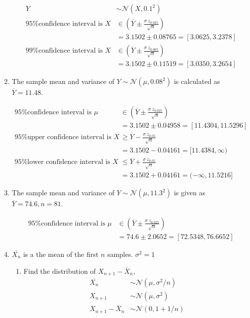 \begin{enumerate}
	
		\begin{align}
			Y &\sim \mathcal{N}(X, 0.1^2) \nonumber \\
			\text{95\% confidence interval is } X &\in \left(\overline{Y} \pm\frac{\sigma\ z_{0.025}}{\sqrt{n}}\right) \nonumber \\
			&= 3.1502 \pm 0.08765 = [3.0625, 3.2378] \\
			\text{99\% confidence interval is } X &\in \left(\overline{Y} \pm\frac{\sigma\ z_{0.005}}{\sqrt{n}}\right) \nonumber \\
			&= 3.1502 \pm 0.11519 = [3.0350, 3.2654]
		\end{align}
	
	
	\item The sample mean and variance of $ Y \sim \mathcal{N} (\mu, 0.08^2) $ is calculated as
	$ \overline{Y} = 11.48$.
	
	
		\begin{align}
			\text{95\% confidence interval is } \mu &\in \left(\overline{Y} \pm\frac{\sigma\ z_{0.025}}{\sqrt{n}}\right) \nonumber \\
			&= 3.1502 \pm 0.04958 = [11.4304, 11.5296] \\
			\text{95\% upper confidence interval is } X &\geq \overline{Y} - \frac{\sigma\ z_{0.05}}{\sqrt{n}} \nonumber \\
			&= 3.1502 - 0.04161 = [11.4384, \infty) \nonumber \\
			\text{95\% lower confidence interval is } X &\leq \overline{Y} + \frac{\sigma\ z_{0.05}}{\sqrt{n}} \nonumber \\
			&= 3.1502 + 0.04161 = (-\infty, 11.5216]
		\end{align}
	
	
	\item The sample mean and variance of $ Y \sim \mathcal{N} (\mu, 11.3^2) $ is given as
	$ \overline{Y} = 74.6, n = 81$.
	
	
		\begin{align}
			\text{95\% confidence interval is } \mu &\in \left(\overline{Y} \pm \frac{\sigma\ z_{0.025}}{\sqrt{n}}\right) \nonumber \\
			&= 74.6 \pm 2.0652 = [72.5348, 76.6652] 
		\end{align}
	
	
	\item $ \overline{X_n} $ is a the mean of the first $ n $ samples. $ \sigma^2 = 1 $ \\
	
		\begin{enumerate}
			\item Find the distribution of $ X_{n+1} - \overline{X}_n $,
			\begin{align}
				\overline{X_n} &\sim \mathcal{N}(\mu, \sigma^2/n) \nonumber \\
				X_{n+1} &\sim \mathcal{N}(\mu, \sigma^2) \nonumber \\
				X_{n+1} - \overline{X}_n &\sim \mathcal{N}(0,1 + 1/n)
			\end{align}
			

\end{enumerate}
\end{enumerate}
